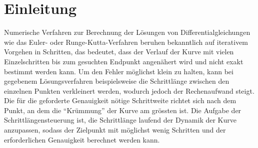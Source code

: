 %
%
%
\section{Einleitung\label{steps:section:einleitung}}

Numerische Verfahren zur Berechnung der Lösungen von
Differentialgleichungen wie das Euler- oder Runge-Kutta-Verfahren
beruhen bekanntlich auf iterativem Vorgehen in Schritten, das
bedeutet, dass der Verlauf
der Kurve mit vielen Einzelschritten bis zum gesuchten Endpunkt angenähert wird und nicht exakt
bestimmt werden kann. Um den Fehler möglichst klein zu halten,
kann bei gegebenem Lösungsverfahren beispielsweise die Schrittlänge zwischen den einzelnen Punkten verkleinert werden, wodurch
%
jedoch der Rechenaufwand steigt. Die für die geforderte Genauigkeit nötige Schrittweite richtet sich
nach dem Punkt, an dem die ``Krümmung'' der Kurve am grössten ist. Die Aufgabe der Schrittlängensteuerung ist,
%
die Schrittlänge laufend der Dynamik der Kurve anzupassen, sodass der
Zielpunkt mit möglichst wenig Schritten und der erforderlichen Genauigkeit berechnet werden
%
kann.


